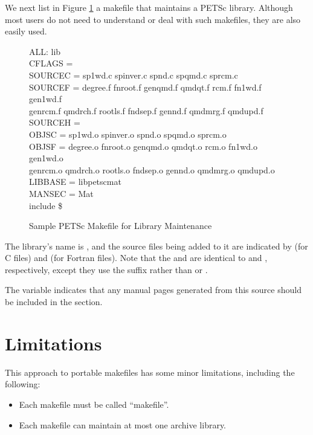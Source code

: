 {{{We next list in Figure \ref{fig_make3} a makefile that maintains a PETSc 
library.  Although most users do not need to understand or deal with such
makefiles, they are also easily used.

\begin{figure}[H]
{\small
\begin{tabbing}
   ALL: lib\\

   CFLAGS   =\\  
   SOURCEC  = sp1wd.c spinver.c spnd.c spqmd.c sprcm.c\\
   SOURCEF  = degree.f  fnroot.f genqmd.f qmdqt.f rcm.f fn1wd.f gen1wd.f \ \\
              genrcm.f qmdrch.f rootls.f fndsep.f gennd.f qmdmrg.f qmdupd.f\\
   SOURCEH  = \\
   OBJSC    = sp1wd.o spinver.o spnd.o spqmd.o sprcm.o\\
   OBJSF    = degree.o  fnroot.o genqmd.o qmdqt.o rcm.o fn1wd.o gen1wd.o \ \\
              genrcm.o qmdrch.o rootls.o fndsep.o gennd.o qmdmrg.o qmdupd.o\\
   LIBBASE  = libpetscmat\\
   MANSEC   = Mat\\

   include \$
\end{tabbing}
}
\caption{Sample PETSc Makefile for Library Maintenance}
\label{fig_make3}
\end{figure}

The library's name is , and the source files being added
to it are indicated by  (for C files) and  (for 
Fortran files). Note that the  and  are identical 
to  and , respectively, except they use the
suffix  rather than  or . 

The variable  indicates that any manual pages generated
from this source should be included in the  section. 

\section{Limitations}

This approach to portable makefiles has some minor limitations, including
the following:
\begin{itemize}
\item Each makefile must be called ``makefile''.
\item Each makefile can maintain at most one archive library.
\end{itemize}


}}}
